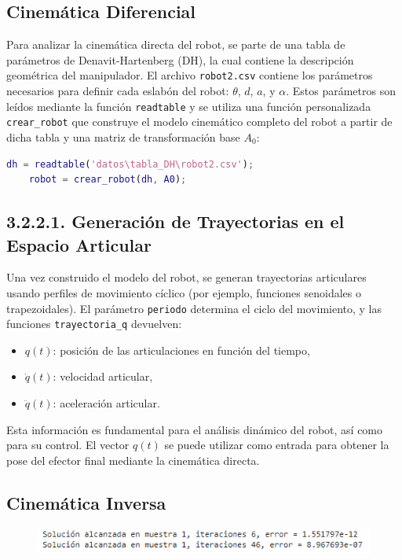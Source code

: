 \subsection{Cinemática Diferencial}
Para analizar la cinemática directa del robot, se parte de una tabla de parámetros de Denavit-Hartenberg (DH), la cual contiene la descripción geométrica del manipulador. El archivo \texttt{robot2.csv} contiene los parámetros necesarios para definir cada eslabón del robot: $\theta$, $d$, $a$, y $\alpha$. Estos parámetros son leídos mediante la función \texttt{readtable} y se utiliza una función personalizada \texttt{crear\_robot} que construye el modelo cinemático completo del robot a partir de dicha tabla y una matriz de transformación base $A_0$:

\begin{lstlisting}[language=Matlab]
	dh = readtable('datos\tabla_DH\robot2.csv');
	robot = crear_robot(dh, A0);
\end{lstlisting}

\subsection*{3.2.2.1. Generación de Trayectorias en el Espacio Articular}
Una vez construido el modelo del robot, se generan trayectorias articulares usando perfiles de movimiento cíclico (por ejemplo, funciones senoidales o trapezoidales). El parámetro \texttt{periodo} determina el ciclo del movimiento, y las funciones \texttt{trayectoria\_q} devuelven:

\begin{itemize}
	\item $q(t)$: posición de las articulaciones en función del tiempo,
	\item $\dot{q}(t)$: velocidad articular,
	\item $\ddot{q}(t)$: aceleración articular.
\end{itemize}

Esta información es fundamental para el análisis dinámico del robot, así como para su control. El vector $q(t)$ se puede utilizar como entrada para obtener la pose del efector final mediante la cinemática directa.


\subsection{Cinemática Inversa}
\begin{figure} [h]
	\centering
	\includegraphics[width=0.7\linewidth]{"../cinematica inversa/img/solucion trayectoria 2"}
	\caption{}
	\label{fig:solucion-trayectoria-2}
\end{figure}

